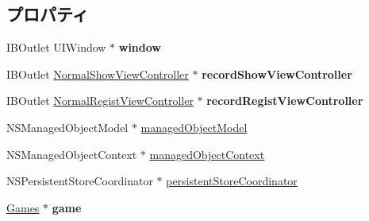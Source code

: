 \subsection*{プロパティ}
\begin{DoxyCompactItemize}
\item 
\hypertarget{interface_go_clinic_app_delegate_a5527da2631d02a15751dacfe76d61b4f}{
IBOutlet UIWindow $\ast$ {\bfseries window}}
\label{interface_go_clinic_app_delegate_a5527da2631d02a15751dacfe76d61b4f}

\item 
\hypertarget{interface_go_clinic_app_delegate_a00675d016a38af8238c498173ddef081}{
IBOutlet \hyperlink{interface_normal_show_view_controller}{NormalShowViewController} $\ast$ {\bfseries recordShowViewController}}
\label{interface_go_clinic_app_delegate_a00675d016a38af8238c498173ddef081}

\item 
\hypertarget{interface_go_clinic_app_delegate_aeafcd017f1e330ef9e32ae95e69bb707}{
IBOutlet \hyperlink{interface_normal_regist_view_controller}{NormalRegistViewController} $\ast$ {\bfseries recordRegistViewController}}
\label{interface_go_clinic_app_delegate_aeafcd017f1e330ef9e32ae95e69bb707}

\item 
NSManagedObjectModel $\ast$ \hyperlink{interface_go_clinic_app_delegate_a83de9dbffc02726a241ab93c8a130ccf}{managedObjectModel}
\item 
NSManagedObjectContext $\ast$ \hyperlink{interface_go_clinic_app_delegate_a56340d41d4eb164878497e7b9ee3fcf6}{managedObjectContext}
\item 
NSPersistentStoreCoordinator $\ast$ \hyperlink{interface_go_clinic_app_delegate_acec743b348a53b0628186921e68af000}{persistentStoreCoordinator}
\item 
\hypertarget{interface_go_clinic_app_delegate_ad15d58435f683d3fbd740b82a60d6866}{
\hyperlink{interface_games}{Games} $\ast$ {\bfseries game}}
\label{interface_go_clinic_app_delegate_ad15d58435f683d3fbd740b82a60d6866}

\end{DoxyCompactItemize}


